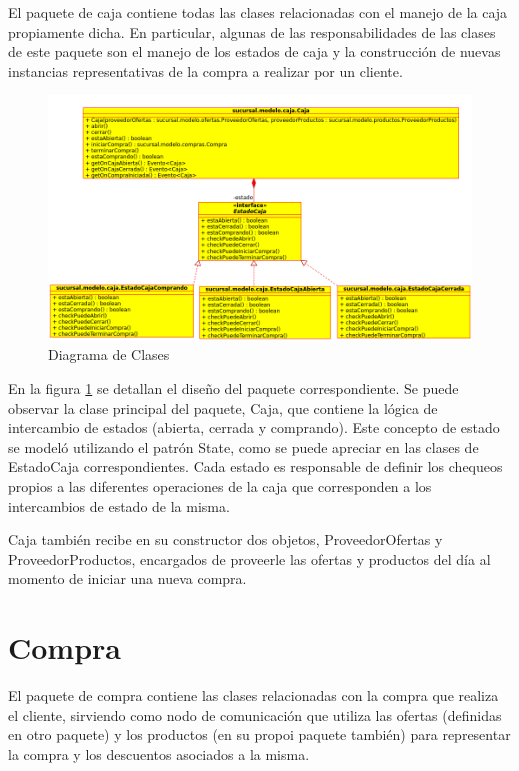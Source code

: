 \documentclass[a4paper,11pt]{article}
\begin{document}
El paquete de caja contiene todas las clases relacionadas con el manejo de la
caja propiamente dicha. En particular, algunas de las responsabilidades de las
clases de este paquete son el manejo de los estados de caja y la construcción
de nuevas instancias representativas de la compra a realizar por un cliente.

\begin{figure}[!htp]
\begin{center}
\includegraphics[width=1\textwidth]{src/docs/caja.png}
\end{center}
\caption{Diagrama de Clases} \label{fig:caja}
\end{figure}

\FloatBarrier

En la figura \ref{fig:caja} se detallan el diseño del paquete correspondiente.
Se puede observar la clase principal del paquete, Caja, que contiene la lógica
de intercambio de estados (abierta, cerrada y comprando). Este concepto de
estado se modeló utilizando el patrón State, como se puede apreciar en las
clases de EstadoCaja correspondientes. Cada estado es responsable de definir
los chequeos propios a las diferentes operaciones de la caja que corresponden a
los intercambios de estado de la misma.

Caja también recibe en su constructor dos objetos, ProveedorOfertas y
ProveedorProductos, encargados de proveerle las ofertas y productos del día al
momento de iniciar una nueva compra.

\section{Compra}

El paquete de compra contiene las clases relacionadas con la compra que realiza
el cliente, sirviendo como nodo de comunicación que utiliza las ofertas
(definidas en otro paquete) y los productos (en su propoi paquete también) para
representar la compra y los descuentos asociados a la misma.
\end{document}
